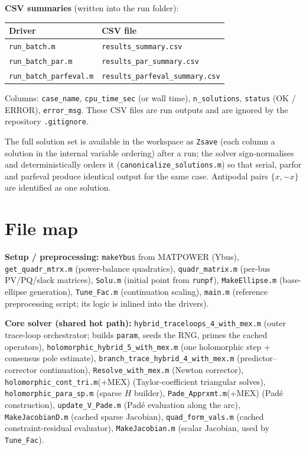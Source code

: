\documentclass[11pt,a4paper]{article}
\newcommand{\code}[1]{\texttt{#1}}
\begin{document}
\textbf{CSV summaries} (written into the run folder):
\begin{center}\small
\begin{tabular}{@{}ll@{}}
\toprule
Driver & CSV file\\
\midrule
\code{run_batch.m}          & \code{results_summary.csv}\\
\code{run_batch_par.m}      & \code{results_par_summary.csv}\\
\code{run_batch_parfeval.m} & \code{results_parfeval_summary.csv}\\
\bottomrule
\end{tabular}
\end{center}
Columns: \code{case_name}, \code{cpu_time_sec} (or wall time), \code{n_solutions},
\code{status} (OK / ERROR), \code{error_msg}.
These CSV files are run outputs and are ignored by the repository \code{.gitignore}.

The full solution set is available in the workspace as \code{Zsave} (each column a
solution in the internal variable ordering) after a run; the solver sign-normalises and
deterministically orders it (\code{canonicalize_solutions.m}) so that serial, parfor and
parfeval produce identical output for the same case. Antipodal pairs $\{x,-x\}$ are
identified as one solution.

\section{File map}

\textbf{Setup / preprocessing:}
\code{makeYbus} from MATPOWER (Ybus), \code{get_quadr_mtrx.m} (power-balance quadratics),
\code{quadr_matrix.m} (per-bus PV/PQ/slack matrices), \code{Solu.m} (initial point from
\code{runpf}), \code{MakeEllipse.m} (base-ellipse generation), \code{Tune_Fac.m}
(continuation scaling), \code{main.m} (reference preprocessing script; its logic is
inlined into the drivers).

\textbf{Core solver (shared hot path):}
\code{hybrid_traceloops_4_with_mex.m} (outer trace-loop orchestrator; builds \code{param},
seeds the RNG, primes the cached operators), \code{holomorphic_hybrid_5_with_mex.m} (one
holomorphic step + consensus pole estimate), \code{branch_trace_hybrid_4_with_mex.m}
(predictor--corrector continuation), \code{Resolve_with_mex.m} (Newton corrector),
\code{holomorphic_cont_tri.m}(+MEX) (Taylor-coefficient triangular solves),
\code{holomorphic_para_sp.m} (sparse $H$ builder), \code{Pade_Apprxmt.m}(+MEX) (Pad\'e
construction), \code{update_V_Pade.m} (Pad\'e evaluation along the arc),
\code{MakeJacobianD.m} (cached sparse Jacobian), \code{quad_form_vals.m} (cached
constraint-residual evaluator), \code{MakeJacobian.m} (scalar Jacobian, used by
\code{Tune_Fac}).
\end{document}
